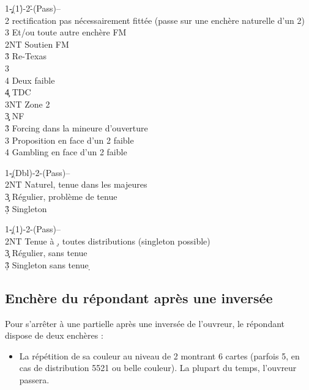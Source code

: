 \documentclass[a4paper]{article}
\begin{document}
\begin{bidtable}
1\c\d-(1\h)-2\h-(Pass)--\\
2\s \> rectification pas nécessairement fittée (passe sur une enchère naturelle d'un 2\s )\+\\
3\s \> Et/ou toute autre enchère FM\-\\
2NT \> Soutien FM\+\\
3\h \> Re-Texas\+\\
3\s\+\\
4\s \> Deux faible\\
4\c \> TDC\\
3NT \> Zone 2\-\-\-\\
3\c\d \> NF\\
3\h \> Forcing dans la mineure d'ouverture\\
3\s \> Proposition en face d'un 2 faible\\
4\s \> Gambling en face d'un 2 faible
\end{bidtable}

\begin{bidtable}
1\c-(Dbl)-2\s-(Pass)--\\
2NT \> Naturel, tenue dans les majeures\\
3\c \> Régulier, problème de tenue\\
3\d\h\s \> Singleton
\end{bidtable}

\begin{bidtable}
1\c-(1\d)-2\s-(Pass)--\\
2NT \> Tenue à \d , toutes distributions (singleton possible)\\
3\c \> Régulier, sans tenue \d \\
3\d\h\s \> Singleton sans tenue \d 
\end{bidtable}

\subsection{Enchère du répondant après une inversée}

Pour s'arrêter à une partielle après une inversée de l'ouvreur, le répondant dispose de deux enchères :

\begin{itemize}
\item La répétition de sa couleur au niveau de 2 montrant 6 cartes (parfois 5, en cas de distribution 5521 ou belle couleur).
  La plupart du temps, l'ouvreur passera.

\end{itemize}
\end{document}
